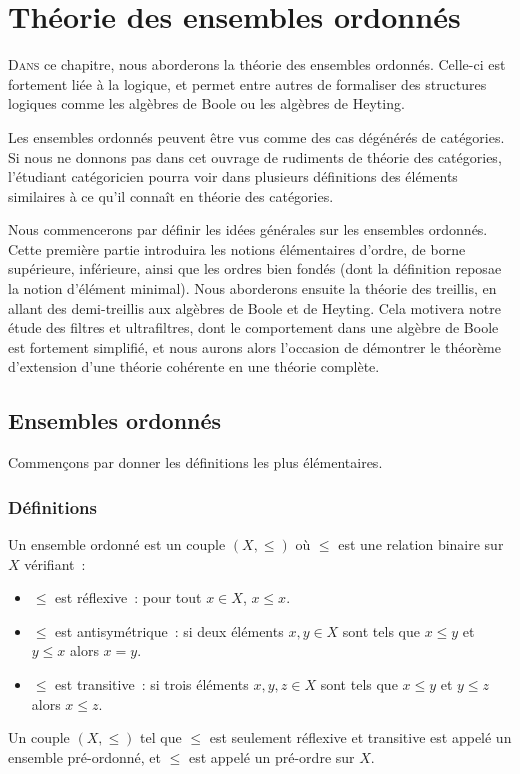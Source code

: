 \chapter{Théorie des ensembles ordonnés}
\label{chp.ordres}

\minitoc

\lettrine{D}{ans} ce chapitre, nous aborderons la théorie des ensembles
ordonnés. Celle-ci est fortement liée à la logique, et permet entre autres de
formaliser des structures logiques comme les algèbres de Boole ou les
algèbres de Heyting.

Les ensembles ordonnés peuvent être vus comme des cas dégénérés de catégories.
Si nous ne donnons pas dans cet ouvrage de rudiments de théorie des catégories,
l'étudiant catégoricien pourra voir dans plusieurs définitions des éléments
similaires à ce qu'il connaît en théorie des catégories.

Nous commencerons par définir les idées générales sur les ensembles ordonnés.
Cette première partie introduira les notions élémentaires d'ordre, de borne
supérieure, inférieure, ainsi que les ordres bien fondés (dont la définition
reposae la notion d'élément minimal).
Nous aborderons ensuite la théorie des treillis, en allant des demi-treillis aux
algèbres de Boole et de Heyting.
Cela motivera notre étude des filtres et ultrafiltres, dont le comportement dans
une algèbre de Boole est fortement simplifié, et nous aurons alors
l'occasion de démontrer le théorème d'extension d'une théorie cohérente en une
théorie complète.

\section{Ensembles ordonnés}

\noindent
Commençons par donner les définitions les plus élémentaires.

\subsection{Définitions}

\begin{definition}
  Un ensemble ordonné est un couple $(X,\leq)$ où $\leq$ est une relation
  binaire sur $X$ vérifiant~:
  \begin{itemize}
  \item $\leq$ est réflexive~: pour tout $x\in X$, $x\leq x$.
  \item $\leq$ est antisymétrique~: si deux éléments $x,y\in X$ sont tels que
    $x\leq y$ et $y\leq x$ alors $x = y$.
  \item $\leq$ est transitive~: si trois éléments $x,y,z\in X$ sont tels que
    $x\leq y$ et $y\leq z$ alors $x\leq z$.
  \end{itemize}

  Un couple $(X,\leq)$ tel que $\leq$ est seulement réflexive et transitive est
  appelé un ensemble pré-ordonné, et $\leq$ est appelé un pré-ordre sur $X$.
\end{definition}


